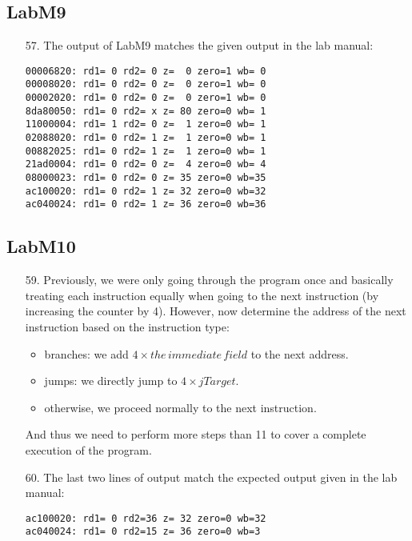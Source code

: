 \documentclass{article}
\begin{document}
\subsection{LabM9}
\begin{enumerate}
\item[57. ] The output of LabM9 matches the given output in the lab manual:
\begin{verbatim}
00006820: rd1= 0 rd2= 0 z=  0 zero=1 wb= 0
00008020: rd1= 0 rd2= 0 z=  0 zero=1 wb= 0
00002020: rd1= 0 rd2= 0 z=  0 zero=1 wb= 0
8da80050: rd1= 0 rd2= x z= 80 zero=0 wb= 1
11000004: rd1= 1 rd2= 0 z=  1 zero=0 wb= 1
02088020: rd1= 0 rd2= 1 z=  1 zero=0 wb= 1
00882025: rd1= 0 rd2= 1 z=  1 zero=0 wb= 1
21ad0004: rd1= 0 rd2= 0 z=  4 zero=0 wb= 4
08000023: rd1= 0 rd2= 0 z= 35 zero=0 wb=35
ac100020: rd1= 0 rd2= 1 z= 32 zero=0 wb=32
ac040024: rd1= 0 rd2= 1 z= 36 zero=0 wb=36
\end{verbatim}
\end{enumerate}

\pagebreak

\subsection{LabM10}
\begin{enumerate}
\item[59. ] Previously, we were only going through the program once and basically
treating each instruction equally when going to the next instruction (by 
increasing the counter by 4). However, now determine the address of the next 
instruction based on the instruction type:
\begin{itemize}
\item branches: we add $4 \times the\,immediate\,field$ to the next address.
\item jumps: we directly jump to $4 \times jTarget$.
\item otherwise, we proceed normally to the next instruction.
\end{itemize}
And thus we need to perform more steps than 11 to cover a complete execution
of the program.

\item[60. ] The last two lines of output match the expected output given in the
lab manual:
\begin{verbatim}
ac100020: rd1= 0 rd2=36 z= 32 zero=0 wb=32
ac040024: rd1= 0 rd2=15 z= 36 zero=0 wb=3
\end{verbatim}
\end{enumerate}
\end{document}
